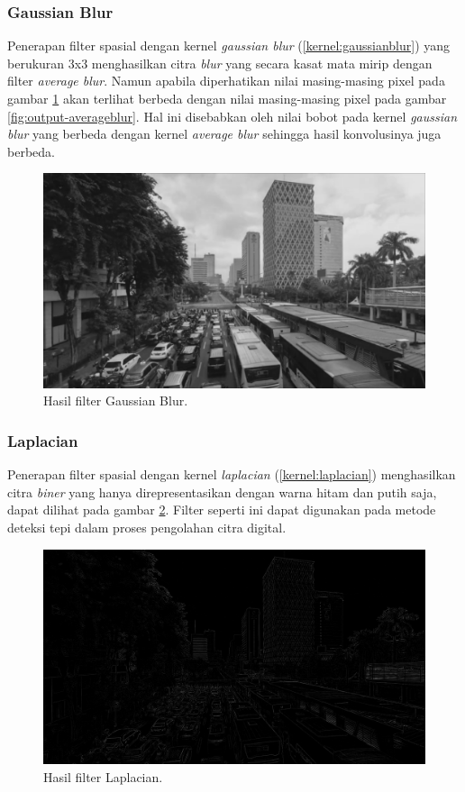 \subsubsection{Gaussian Blur}
Penerapan filter spasial dengan kernel \textit{gaussian blur} (\ref{kernel:gaussianblur}) yang berukuran 3x3 menghasilkan citra \textit{blur} yang secara kasat mata mirip dengan filter \textit{average blur}. Namun apabila diperhatikan nilai masing-masing pixel pada gambar \ref{fig:output-gaussianblur} akan terlihat berbeda dengan nilai masing-masing pixel pada gambar \ref{fig:output-averageblur}. Hal ini disebabkan oleh nilai bobot pada kernel \textit{gaussian blur} yang berbeda dengan kernel \textit{average blur} sehingga hasil konvolusinya juga berbeda. 
\begin{figure}
    \includegraphics[width=0.8\linewidth, center]{images/output-image/input1-gaussianblur.png}
    \caption{Hasil filter Gaussian Blur.}
    \label{fig:output-gaussianblur}
\end{figure}

\subsubsection{Laplacian}
Penerapan filter spasial dengan kernel \textit{laplacian} (\ref{kernel:laplacian}) menghasilkan citra \textit{biner} yang hanya direpresentasikan dengan warna hitam dan putih saja, dapat dilihat pada gambar \ref{fig:output-laplacian}. Filter seperti ini dapat digunakan pada metode deteksi tepi dalam proses pengolahan citra digital.
\begin{figure}
    \includegraphics[width=0.8\linewidth, center]{images/output-image/input1-laplacian.png}
    \caption{Hasil filter Laplacian.}
    \label{fig:output-laplacian}
\end{figure}


